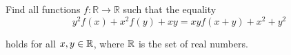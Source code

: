 Find all functions $f : \mathbb R \to \mathbb R$ such that the equality\[y^2f(x) + x^2f(y) + xy = xyf(x + y) + x^2 + y^2\]

holds for all $x, y \in \Bbb R$,  where $\Bbb R$ is the set of real numbers.